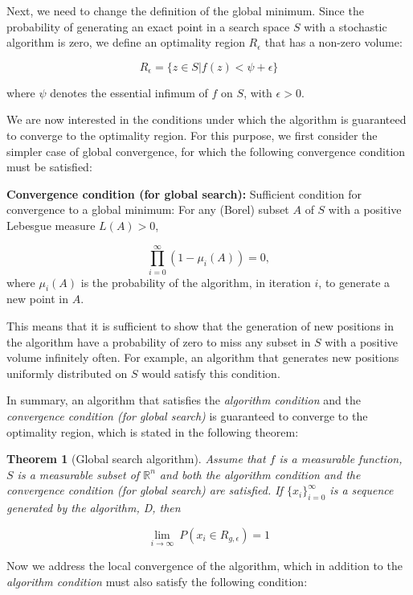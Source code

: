 \documentclass[
  oneside, a4paper, 12pt, openany]{book}
\newtheorem{theorem}{Theorem}[chapter]
\theoremstyle{definition}
\theoremstyle{definition}
\theoremstyle{definition}
\theoremstyle{definition}
\theoremstyle{remark}
\begin{document}
Next, we need to change the definition of the global minimum. Since the probability of generating an exact point in a search space \(S\) with a stochastic algorithm is zero, we define an optimality region \(R_{\epsilon}\) that has a non-zero volume:

\[
 R_{\epsilon} = \{z\in S| f(z) < \psi + \epsilon\}
\]

where \(\psi\) denotes the essential infimum of \(f\) on \(S\), with \(\epsilon > 0\).

We are now interested in the conditions under which the algorithm is guaranteed to converge to the optimality region. For this purpose, we first consider the simpler case of global convergence, for which the following convergence condition must be satisfied:

\textbf{Convergence condition (for global search):} Sufficient condition for convergence to a global minimum: For any (Borel) subset \(A\) of \(S\) with a positive Lebesgue measure \(L(A)>0\),

\[
  \prod_{i=0}^\infty (1-\mu_i(A)) = 0,
\]
where \(\mu_i(A)\) is the probability of the algorithm, in iteration \(i\), to generate a new point in \(A\).

This means that it is sufficient to show that the generation of new positions in the algorithm have a probability of zero to miss any subset in \(S\) with a positive volume infinitely often. For example, an algorithm that generates new positions uniformly distributed on \(S\) would satisfy this condition.

In summary, an algorithm that satisfies the \emph{algorithm condition} and the \emph{convergence condition (for global search)} is guaranteed to converge to the optimality region, which is stated in the following theorem:

\begin{theorem}[Global search algorithm]
Assume that \(f\) is a measurable function, \(S\) is a measurable subset of \(\mathbb{R}^n\) and both the algorithm condition and the convergence condition (for global search) are satisfied. If \(\{x_i\}^{\infty}_{i=0}\) is a sequence generated by the algorithm, D, then

\[
  \lim_{i\rightarrow \infty} \ P(x_i \in R_{g,\epsilon}) = 1
\]
\end{theorem}

Now we address the local convergence of the algorithm, which in addition to the \emph{algorithm condition} must also satisfy the following condition:
\end{document}
